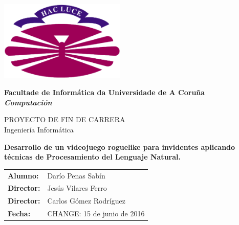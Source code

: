 %
%

%

\begin{titlepage}

	\begin{center}

		\includegraphics[width=6cm]{./eps/logo_udc.eps}
		\vspace{2cm}

		{\Large{\textbf{Facultade de Informática da Universidade de A Coruña}}}
		\\
		{\it \large{\textbf{Computación}}}
		\vspace{1cm}

		{\large PROYECTO DE FIN DE CARRERA\\Ingeniería Informática}
		\vspace{1cm}

		\textbf{\Large Desarrollo de un videojuego roguelike para invidentes aplicando técnicas de Procesamiento del Lenguaje Natural.}
		\vspace{7cm}
	\end{center}

	\begin{flushright}
		\begin{tabular}{ll}
			\large{\textbf{Alumno:}}	&
			\large{Darío Penas Sabín} \\

			\large{\textbf{Director:}}	&
			\large{Jesús Vilares Ferro} \\

			\large{\textbf{Director:}}	&
			\large{Carlos Gómez Rodríguez} \\

			\large{\textbf{Fecha:}}	&
			\large{CHANGE: 15 de junio de 2016} \\
		\end{tabular}
	\end{flushright}

\end{titlepage}
